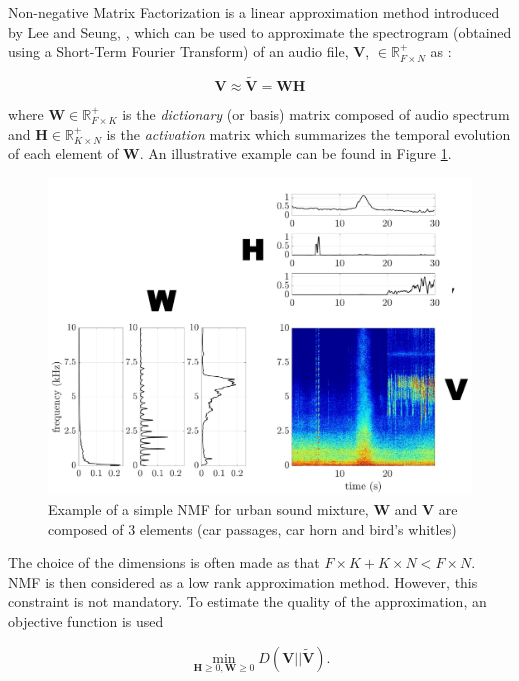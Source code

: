 \documentclass[twocolumn,a4paper,10pt]{article}
\begin{document}
Non-negative Matrix Factorization is a linear approximation method introduced by Lee and Seung, \cite{lee_learning_1999}, which can be used to approximate the spectrogram (obtained using a Short-Term Fourier Transform) of an audio file, $\mathbf{V}$, $\in \mathbb{R}^+_{F \times N}$ as :

\begin{equation}\label{eq:nmf}
\mathbf{V} \approx \mathbf{\tilde{V}} = \mathbf{WH}
\end{equation}

where $\mathbf{W} \in \mathbb{R}^+_{F \times K}$ is the \textit{dictionary} (or basis) matrix composed of audio spectrum and $\mathbf{H} \in \mathbb{R}^+_{K \times N}$ is the \textit{activation} matrix which summarizes the temporal evolution of each element of $\mathbf{W}$. An illustrative example can be found in Figure  \ref{fig:example_NMF}.

\begin{figure}[t]
\centering
\includegraphics[width=0.9\linewidth]{figures/schema_introduction_nmf.pdf}
\caption{Example of a simple NMF  for urban sound mixture, $\mathbf{W}$ and $\mathbf{V}$ are composed of 3 elements (car passages, car horn and bird's whitles)}
\label{fig:example_NMF}
\end{figure}

The choice of the dimensions is often made as that $F\times K + K \times N < F \times N$. NMF is then considered as a low rank approximation method. However, this constraint is not mandatory. To estimate the quality of the approximation, an objective function is used

\begin{equation}\label{eq:min-D-WH}
\underset{\mathbf{H} \geq 0, \mathbf{W} \geq 0}{\min} D\left(\mathbf{V} \vert \vert \mathbf{\tilde{V}}\right).
\end{equation}
\end{document}
